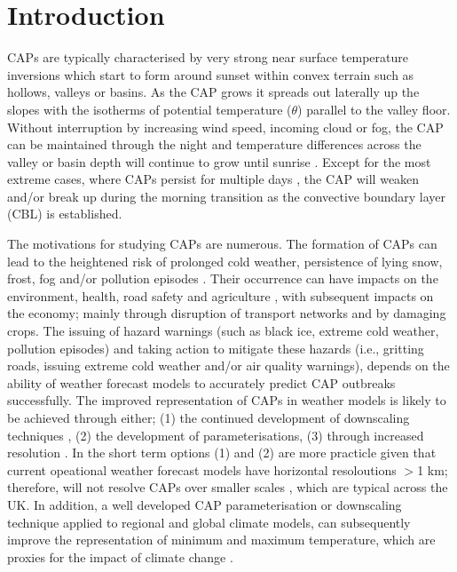 \documentclass[times]{qjrms4}
\begin{document}

\maketitle

\section{Introduction}
CAPs are typically characterised by very strong near surface temperature inversions which start to form around sunset within convex terrain such as hollows, valleys or basins. As the CAP grows it spreads out laterally up the slopes with the isotherms of potential temperature ($\theta$) parallel to the valley floor. Without interruption by increasing wind speed, incoming cloud or fog, the CAP can be maintained through the night and temperature differences across the valley or basin depth will continue to grow until sunrise \citep{gustavssonetal1998}. Except for the most extreme cases, where CAPs persist for multiple days \citep{whiteman2001cold}, the CAP will weaken and/or break up during the morning transition as the convective boundary layer (CBL) is established.

The motivations for studying CAPs are numerous. The formation of CAPs can lead to the heightened risk of prolonged cold weather, persistence of lying snow, frost, fog and/or pollution episodes \citep{lareauetal2013persist}. Their occurrence can have impacts on the environment, health, road safety \citep{bogren2000local} and agriculture \citep{lindkvistetal2000,madelin2005spatial}, with subsequent impacts on the economy; mainly through disruption of transport networks and by damaging crops. The issuing of hazard warnings (such as black ice, extreme cold weather, pollution episodes) and taking action to mitigate these hazards (i.e., gritting roads, issuing extreme cold weather and/or air quality warnings), depends on the ability of weather forecast models to accurately predict CAP outbreaks successfully. The improved representation of CAPs in weather models is likely to be achieved through either; (1) the continued development of downscaling techniques \citep{pozdnoukhov2009data,sheridan2013characteristics}, (2) the development of parameterisations, (3) through increased resolution \citep{vosper2013high,hughes2015assessment}. In the short term options (1) and (2) are more practicle given that current opeational weather forecast models have horizontal resoloutions $>$1 km; therefore, will not resolve CAPs over smaller scales \citep{vosper2013high}, which are typical across the UK. In addition, a well developed CAP parameterisation or downscaling technique applied to regional and global climate models, can subsequently improve the representation of minimum and maximum temperature, which are proxies for the impact of climate change \citep{daly2010local}.
	
\end{document}
